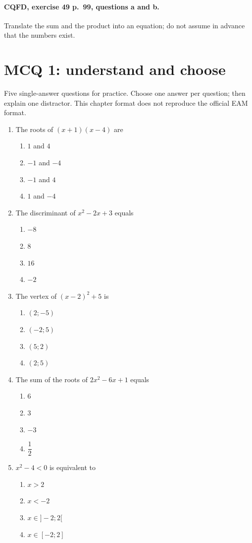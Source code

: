 \paragraph{CQFD, exercise 49 p.~99, questions a and b.}\label{C02-M2} Translate the sum and the product into an equation; do not assume in advance that the numbers exist.
\begingroup\small
\clearpage\section*{MCQ 1: understand and choose}\label{C02-Q1}
Five single-answer questions for practice. Choose one answer per question; then explain one distractor. This chapter format does not reproduce the official EAM format.
\begin{enumerate}
\item The roots of $(x+1)(x-4)$ are
\begin{enumerate}[label=\Alph*.,itemsep=2pt]
\item $1$ and $4$
\item $-1$ and $-4$
\item $-1$ and $4$
\item $1$ and $-4$
\end{enumerate}
\item The discriminant of $x^2-2x+3$ equals
\begin{enumerate}[label=\Alph*.,itemsep=2pt]
\item $-8$
\item $8$
\item $16$
\item $-2$
\end{enumerate}
\item The vertex of $(x-2)^2+5$ is
\begin{enumerate}[label=\Alph*.,itemsep=2pt]
\item $(2;-5)$
\item $(-2;5)$
\item $(5;2)$
\item $(2;5)$
\end{enumerate}
\item The sum of the roots of $2x^2-6x+1$ equals
\begin{enumerate}[label=\Alph*.,itemsep=2pt]
\item $6$
\item $3$
\item $-3$
\item $\dfrac{1}{2}$
\end{enumerate}
\item $x^2-4<0$ is equivalent to
\begin{enumerate}[label=\Alph*.,itemsep=2pt]
\item $x>2$
\item $x<-2$
\item $x\in]-2;2[$
\item $x\in[-2;2]$
\end{enumerate}
\end{enumerate}
